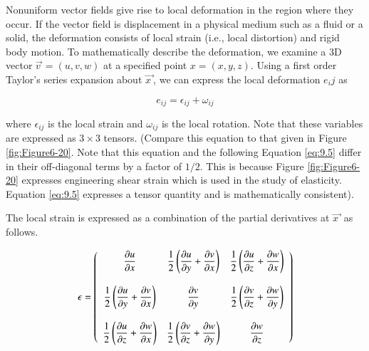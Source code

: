 Nonuniform vector fields give rise to local deformation in the region where they occur. If the vector field is displacement in a physical medium such as a fluid or a solid, the deformation consists of local strain (i.e., local distortion) and rigid body motion. To mathematically describe the deformation, we examine a 3D vector $\overrightarrow{v\ } = (u, v, w)$ at a specified point $x = (x, y, z)$. Using a first order Taylor's series expansion about $\overrightarrow{x\ }$, we can express the local deformation $e_ij$ as

\begin{equation}\label{eq:9.4}
e_{ij} = \epsilon_{ij} + \omega_{ij}
\end{equation}

where $\epsilon_{ij}$ is the local strain and $\omega_{ij}$ is the local rotation. Note that these variables are expressed as $3 \times 3$ tensors. (Compare this equation to that given in Figure \ref{fig:Figure6-20}. Note that this equation and the following Equation \ref{eq:9.5} differ in their off-diagonal terms by a factor of $1/2$. This is because Figure \ref{fig:Figure6-20} expresses engineering shear strain which is used in the study of elasticity. Equation \ref{eq:9.5} expresses a tensor quantity and is mathematically consistent).

The local strain is expressed as a combination of the partial derivatives at $\overrightarrow{x\ }$ as follows.

\begin{equation}\label{eq:9.5}
\mathbf{\epsilon} = \left(
\begin{array}{c c c}
  \dfrac{\partial u}{\partial x} &
  \dfrac{1}{2}\left(\dfrac{\partial u}{\partial y} + \dfrac{\partial v}{\partial x}\right) &
  \dfrac{1}{2}\left(\dfrac{\partial u}{\partial z} + \dfrac{\partial w}{\partial x}\right) \\ \\
  \dfrac{1}{2}\left(\dfrac{\partial u}{\partial y} + \dfrac{\partial v}{\partial x}\right) &
  \dfrac{\partial v}{\partial y} &
  \dfrac{1}{2}\left(\dfrac{\partial v}{\partial z} + \dfrac{\partial w}{\partial y}\right) \\ \\
  \dfrac{1}{2}\left(\dfrac{\partial u}{\partial z} + \dfrac{\partial w}{\partial x}\right) &
  \dfrac{1}{2}\left(\dfrac{\partial v}{\partial z} + \dfrac{\partial w}{\partial y}\right) &
  \dfrac{\partial w}{\partial z}
\end{array}\right)
\end{equation}

